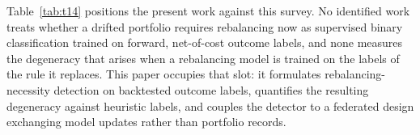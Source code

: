 Table~\ref{tab:t14} positions the present work against this survey. No
identified work treats whether a drifted portfolio requires rebalancing now as
supervised binary classification trained on forward, net-of-cost outcome
labels, and none measures the degeneracy that arises when a rebalancing model
is trained on the labels of the rule it replaces. This paper occupies that
slot: it formulates rebalancing-necessity detection on backtested outcome
labels, quantifies the resulting degeneracy against heuristic labels, and
couples the detector to a federated design exchanging model updates rather
than portfolio records.
